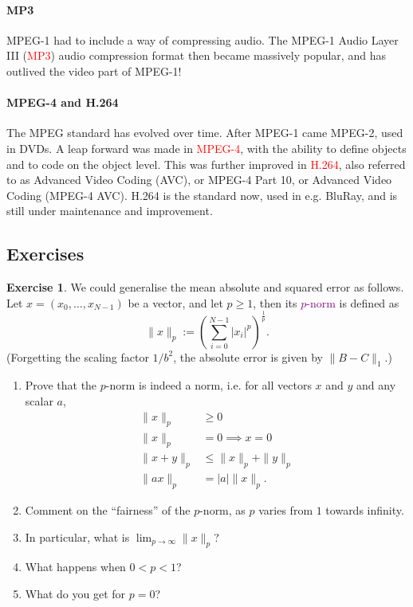 \documentclass[a4paper, 11pt, openany]{book}
\numberwithin{equation}{section}
\theoremstyle{plain}
\theoremstyle{definition}
\newtheorem{exercise}   {Exercise}  [section]
\newcommand{\Important}[1]{\textcolor{red}{#1}}
\newcommand{\Define}[1]{\textcolor{purple}{#1}}
\begin{document}
\paragraph{MP3} MPEG-1 had to include a way of compressing audio. The MPEG-1 Audio Layer III (\Important{MP3}) audio compression format then became massively popular, and has outlived the video part of MPEG-1!

\paragraph{MPEG-4 and H.264} The MPEG standard has evolved over time. After MPEG-1 came MPEG-2, used in DVDs. A leap forward was made in \Important{MPEG-4}, with the ability to define objects and to code on the object level. This was further improved in \Important{H.264}, also referred to as Advanced Video Coding (AVC), or MPEG-4 Part 10, or Advanced Video Coding (MPEG-4 AVC). H.264 is the standard now, used in e.g. BluRay, and is still under maintenance and improvement.



\subsection{Exercises}
\begin{exercise}
We could generalise the mean absolute and squared error as follows. Let $x = (x_0, \dots, x_{N-1})$ be a vector, and let $p \ge 1$, then its \Define{$p$-norm} is defined as
\[
    \| x \|_p := \left( \sum_{i=0}^{N-1} |x_i|^p \right)^{\frac{1}{p}}.
\]
(Forgetting the scaling factor $1/b^2$, the absolute error is given by $\| B - C \|_1$.)
\begin{enumerate}
    \item Prove that the $p$-norm is indeed a norm, i.e. for all vectors $x$ and $y$ and any scalar $a$,
    \begin{align*}
        \| x \|_p &\ge 0\\
        \| x \|_p &=0 \implies x = 0\\
        \|x + y \|_p &\le \| x \|_p + \| y \|_p\\
        \| ax \|_p &= |a| \| x \|_p.
    \end{align*}
    
    \item Comment on the ``fairness'' of the $p$-norm, as $p$ varies from $1$ towards infinity.
    
    \item In particular, what is $\lim_{p \to \infty} \| x\|_p$?
    
    \item What happens when $0 < p < 1$?
    
    \item What do you get for $p = 0$?
\end{enumerate}
\end{exercise}
\end{document}
